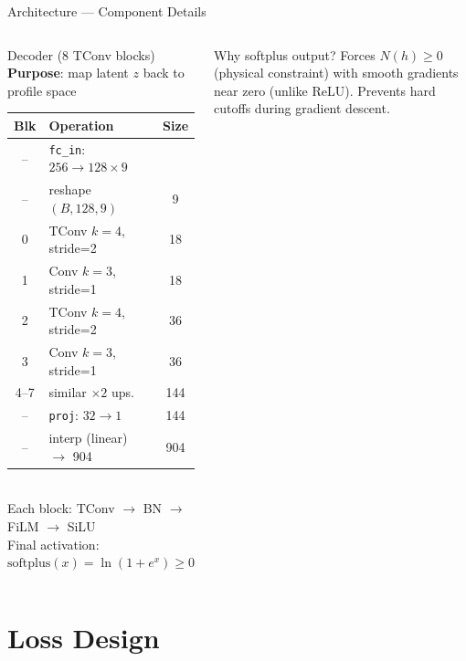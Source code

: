 \documentclass[aspectratio=169,10pt]{beamer}
\begin{document}
\begin{frame}{Architecture — Component Details}
\begin{columns}
\begin{block}{Decoder (8 TConv blocks)}
  \scriptsize
  \textbf{Purpose}: map latent $z$ back to profile space\\[3pt]
  \begin{tabular}{@{}clc@{}}
  \toprule
  Blk & Operation & Size\\
  \midrule
  -- & \texttt{fc\_in}: $256\!\to\!128\!\times\!9$ & \\
  -- & reshape $(B,128,9)$ & 9\\
  0 & TConv $k=4$, stride=2 & 18\\
  1 & Conv $k=3$, stride=1  & 18\\
  2 & TConv $k=4$, stride=2 & 36\\
  3 & Conv $k=3$, stride=1  & 36\\
  4--7 & similar $\times 2$ ups. & 144\\
  -- & \texttt{proj}: $32\!\to\!1$ & 144\\
  -- & interp (linear) $\to$ 904 & 904\\
  \bottomrule
  \end{tabular}\\[3pt]
  Each block: TConv $\to$ BN $\to$ FiLM $\to$ SiLU\\
  Final activation: $\mathrm{softplus}(x) = \ln(1+e^x)\geq 0$
\end{block}
\vspace{3pt}
\begin{alertblock}{\scriptsize Why softplus output?}
  \scriptsize
  Forces $N(h)\geq 0$ (physical constraint) with smooth
  gradients near zero (unlike ReLU). Prevents hard
  cutoffs during gradient descent.
\end{alertblock}
\end{columns}
\end{frame}

\section{Loss Design}
\end{document}
